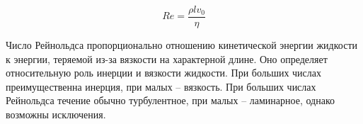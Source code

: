 \begin{equation}
    Re = \frac{\rho l v_0}{\eta}
\end{equation}

Число Рейнольдса пропорционально отношению кинетической энергии жидкости к энергии, теряемой из-за вязкости на характерной длине. Оно определяет относительную роль инерции и вязкости жидкости. При больших числах преимущественна инерция, при малых -- вязкость. При больших числах Рейнольдса течение обычно турбулентное, при малых -- ламинарное, однако возможны исключения.